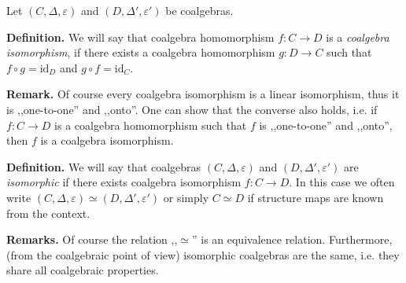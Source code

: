 \documentclass[12pt]{article}
\begin{document}
Let $(C,\Delta,\varepsilon)$ and $(D,\Delta',\varepsilon')$ be coalgebras.

\textbf{Definition.} We will say that coalgebra homomorphism $f:C\to D$ is a \textit{coalgebra isomorphism}, if there exists a coalgebra homomorphism $g:D\to C$ such that $f\circ g=\mathrm{id}_{D}$ and $g\circ f=\mathrm{id}_{C}$.

\textbf{Remark.} Of course every coalgebra isomorphism is a linear isomorphism, thus it is ,,one-to-one'' and ,,onto''. One can show that the converse also holds, i.e. if $f:C\to D$ is a coalgebra homomorphism such that $f$ is ,,one-to-one'' and ,,onto'', then $f$ is a coalgebra isomorphism.

\textbf{Definition.} We will say that coalgebras $(C,\Delta,\varepsilon)$ and $(D,\Delta',\varepsilon')$ are \textit{isomorphic} if there exists coalgebra isomorphism $f:C\to D$. In this case we often write $(C,\Delta,\varepsilon)\simeq (D,\Delta',\varepsilon')$ or simply $C\simeq D$ if structure maps are known from the context.

\textbf{Remarks.} Of course the relation ,,$\simeq$'' is an equivalence relation. Furthermore, (from the coalgebraic point of view) isomorphic coalgebras are the same, i.e. they share all coalgebraic properties.
\end{document}
